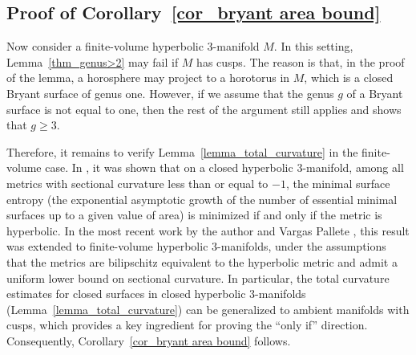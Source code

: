 \documentclass[12pt,a4paper]{amsart}
\numberwithin{equation}{section}
\theoremstyle{plain}
\theoremstyle{named}
\theoremstyle{definition}
\begin{document}
\subsection{Proof of Corollary~\ref{cor_bryant area bound}}
Now consider a finite-volume hyperbolic $3$-manifold $M$. In this setting, Lemma~\ref{thm_genus>2} may fail if $M$ has cusps. The reason is that, in the proof of the lemma, a horosphere may project to a horotorus in $M$, which is a closed Bryant surface of genus one. However, if we assume that the genus $g$ of a Bryant surface is not equal to one, then the rest of the argument still applies and shows that $g\geq 3$.

Therefore, it remains to verify Lemma~\ref{lemma_total_curvature} in the finite-volume case. In \cite{Calegari-Marques-Neves}, it was shown that on a closed hyperbolic $3$-manifold, among all metrics with sectional curvature less than or equal to $-1$, the minimal surface entropy (the exponential asymptotic growth of the number of essential minimal surfaces up to a given value of area) is minimized if and only if the metric is hyperbolic. In the most recent work by the author and Vargas Pallete \cite[Theorem B]{Jiang-VargasPallete}, this result was extended to finite-volume hyperbolic $3$-manifolds, under the assumptions that the metrics are bilipschitz equivalent to the hyperbolic metric and admit a uniform lower bound on sectional curvature. In particular, the total curvature estimates for closed surfaces in closed hyperbolic $3$-manifolds (Lemma~\ref{lemma_total_curvature}) can be generalized to ambient manifolds with cusps, which provides a key ingredient for proving the ``only if'' direction. Consequently, Corollary~\ref{cor_bryant area bound} follows.

 
 
 
   
\end{document}
